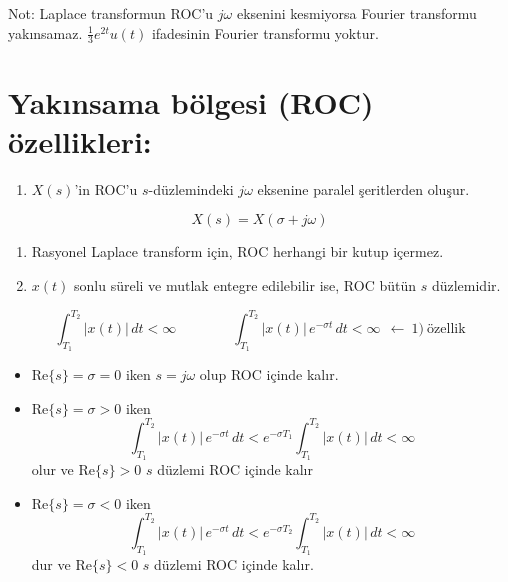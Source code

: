 \documentclass[11pt,a4paper]{article}
\begin{document}
Not: Laplace transformun ROC'u $j\omega$ eksenini kesmiyorsa Fourier transformu yakınsamaz.
$\frac{1}{3}e^{2t}u(t)$ ifadesinin Fourier transformu yoktur.

\section{Yakınsama bölgesi (ROC) özellikleri:}
\begin{enumerate}[label=\arabic*), leftmargin=2em, itemsep=5pt]
  \item $X(s)$'in ROC'u $s$-düzlemindeki $j\omega$ eksenine paralel şeritlerden oluşur.
\end{enumerate}
\[ X(s)=X(\sigma+j\omega) \]

\nopagebreak
\begin{enumerate}[label=\arabic*), leftmargin=2em, itemsep=5pt, start=2]
  \item Rasyonel Laplace transform için, ROC herhangi bir kutup içermez.
  \item $x(t)$ sonlu süreli ve mutlak entegre edilebilir ise, ROC bütün $s$ düzlemidir.
\end{enumerate}
\[ \int_{T_1}^{T_2}|x(t)|\,dt<\infty\qquad\qquad \int_{T_1}^{T_2}|x(t)|\,e^{-\sigma t}\,dt<\infty\ \ \leftarrow\ 1)\ \text{özellik} \]
\begin{itemize}[label=$\to$, leftmargin=2em, itemsep=3pt]
  \item $\mathrm{Re}\{s\}=\sigma=0$ iken $s=j\omega$ olup ROC içinde kalır.
  \item $\mathrm{Re}\{s\}=\sigma>0$ iken
    \[ \int_{T_1}^{T_2}|x(t)|\,e^{-\sigma t}\,dt<e^{-\sigma T_1}\int_{T_1}^{T_2}|x(t)|\,dt<\infty \]
    olur ve $\mathrm{Re}\{s\}>0$ $s$ düzlemi ROC içinde kalır
  \item $\mathrm{Re}\{s\}=\sigma<0$ iken
    \[ \int_{T_1}^{T_2}|x(t)|\,e^{-\sigma t}\,dt<e^{-\sigma T_2}\int_{T_1}^{T_2}|x(t)|\,dt<\infty \]
    dur ve $\mathrm{Re}\{s\}<0$ $s$ düzlemi ROC içinde kalır.
\end{itemize}
\end{document}
